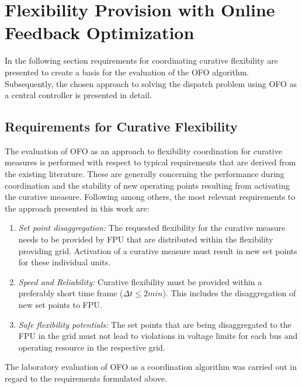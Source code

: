 \documentclass[conference,a4paper]{IEEEtran}
\begin{document}
\section{Flexibility Provision with Online Feedback Optimization}
\label{sec:Modelling}
In the following section requirements for coordinating curative flexibility are presented to create a basis for the evaluation of the OFO algorithm. Subsequently, the chosen approach to solving the dispatch problem using OFO as a central controller is presented in detail.
 \subsection{Requirements for Curative Flexibility}
 \label{subsec:Requirements}
The evaluation of OFO as an approach to flexibility coordination for curative measures is performed with respect to typical requirements that are derived from the existing literature. These are generally concerning the performance during coordination and the stability of new operating points resulting from activating the curative measure. Following \cite{Kolster_2022} among others, the most relevant requirements to the approach presented in this work are:
\begin{enumerate}
    \item \emph{Set point disaggregation:} The requested flexibility for the curative measure needs to be provided by FPU that are distributed within the flexibility providing grid. Activation of a curative measure must result in new set points for these individual units.
    \item \emph{Speed and Reliability:} Curative flexibility must be provided within a preferably short time frame ($\Delta t \leq 2 min$). This includes the disaggregation of new set points to FPU.
    \item \emph{Safe flexibility potentials:} The set points that are being disaggregated to the FPU in the grid must not lead to violations in voltage limits for each bus and operating resource in the respective grid.
\end{enumerate}
The laboratory evaluation of OFO as a coordination algorithm was carried out in regard to the requirements formulated above.
\end{document}
